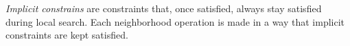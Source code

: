 \emph{Implicit constrains} are constraints that, once satisfied, always stay satisfied during local search. 
Each neighborhood operation is made in a way that implicit constraints are kept satisfied.   